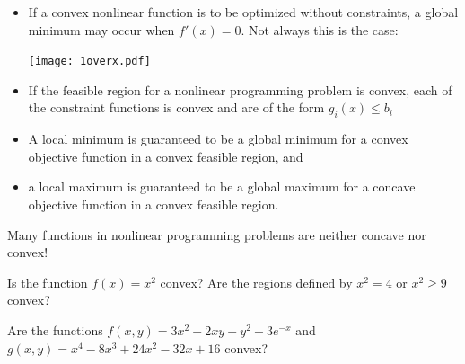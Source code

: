 \documentclass[c]{beamer}
\begin{document}
\begin{frame}[t]
  \begin{itemize}
    \item If a convex nonlinear function is to be optimized without constraints, a global minimum may occur when $f'(x)=0$. Not always this is the case:
    \begin{center}
      \texttt{[image: 1overx.pdf]}
    \end{center}
    \item If the feasible region for a nonlinear programming problem is convex, each of the constraint functions is convex and are of the form $g_i(x)\leq b_i$
  \end{itemize}
\end{frame}
\begin{frame}[t]
\begin{itemize}
    \item A local minimum is guaranteed to be a global minimum for a convex objective function in a convex feasible region, and
    \item a local maximum is guaranteed to be a global maximum for a concave objective function in a convex feasible region.
  \end{itemize}
  Many functions in nonlinear programming problems are neither concave nor convex!
  \begin{Exercise}
    Is the function $f(x)=x^2$ convex? Are the regions defined by $x^2=4$ or $x^2\geq 9$ convex?
  \end{Exercise}

    \begin{Exercise}
    Are the functions $f(x,y)=3x^2-2xy+y^2+3e^{-x}$ and $g(x,y)=x^4-8x^3+24x^2-32x+16$ convex? 
  \end{Exercise}
\end{frame}
\end{document}
